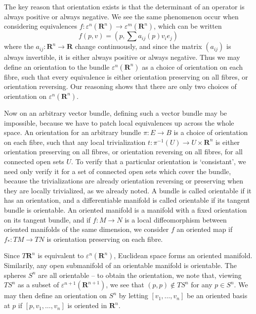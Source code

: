 The key reason that orientation exists is that the determinant of an operator is always positive or always negative. We see the same phenomenon occur when considering equivalences $f: \varepsilon^n(\mathbf{R}^n) \to \varepsilon^m(\mathbf{R}^n)$, which can be written
%
\[ f(p,v) = \left(p, \sum a_{ij}(p) v_i e_j \right) \]
%
where the $a_{ij}: \mathbf{R}^n \to \mathbf{R}$ change continuously, and since the matrix $(a_{ij})$ is always invertible, it is either always positive or always negative. Thus we may define an orientation to the bundle $\varepsilon^n(\mathbf{R}^n)$ as a choice of orientation on each fibre, such that every equivalence is either orientation preserving on all fibres, or orientation reversing. Our reasoning shows that there are only two choices of orientation on $\varepsilon^n(\mathbf{R}^n)$.

Now on an arbitrary vector bundle, defining such a vector bundle may be impossible, because we have to patch local equivalences up across the whole space. An orientation for an arbitrary bundle $\pi: E \to B$ is a choice of orientation on each fibre, such that any local trivialization $t: \pi^{-1}(U) \to U \times \mathbf{R}^n$ is either orientation preserving on all fibres, or orientation reversing on all fibres, for all connected open sets $U$. To verify that a particular orientation is `consistant', we need only verify it for a set of connected open sets which cover the bundle, because the trivializations are already orientation reversing or preserving when they are locally trivialized, as we already noted. A bundle is called orientable if it has an orientation, and a differentiable manifold is called orientable if its tangent bundle is orientable. An oriented manifold is a manifold with a fixed orientation on its tangent bundle, and if $f: M \to N$ is a local diffeomorphism between oriented manifolds of the same dimension, we consider $f$ an oriented map if $f_*: TM \to TN$ is orientation preserving on each fibre.

Since $T\mathbf{R}^n$ is equivalent to $\varepsilon^n(\mathbf{R}^n)$, Euclidean space forms an oriented manifold. Similarily, any open submanifold of an orientable manifold is orientable. The spheres $S^n$ are all orientable -- to obtain the orientation, we note that, viewing $TS^n$ as a subset of $\varepsilon^{n+1}(\mathbf{R}^{n+1})$, we see that $(p,p) \not \in TS^n$ for any $p \in S^n$. We may then define an orientation on $S^n$ by letting $[v_1, \dots, v_n]$ be an oriented basis at $p$ if $[p,v_1, \dots, v_n]$ is oriented in $\mathbf{R}^n$.

